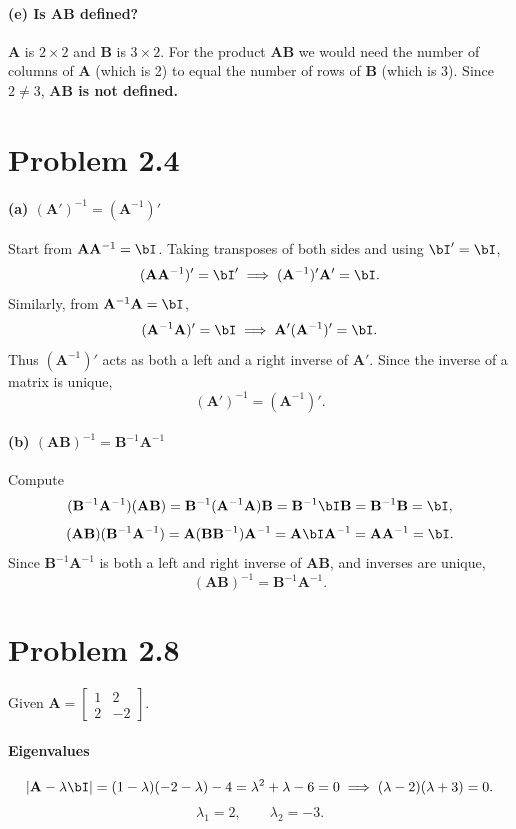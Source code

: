 \documentclass[11pt]{article}
\newcommand{\bA}{\mathbf{A}}
\newcommand{\bB}{\mathbf{B}}
\begin{document}
\paragraph{(e) Is $\bA\bB$ defined?}
$\bA$ is $2\times 2$ and $\bB$ is $3\times 2$. For the product $\bA\bB$ we would need the number of columns of $\bA$ (which is 2) to equal the number of rows of $\bB$ (which is 3). Since $2 \neq 3$, \textbf{$\bA\bB$ is not defined.}

\section*{Problem 2.4}

\paragraph{(a) $(\bA')^{-1} = (\bA^{-1})'$}
Start from $\bA\bA^{-1} = \bI$. Taking transposes of both sides and using $\bI' = \bI$,
\[
(\bA\bA^{-1})' = \bI' \;\Longrightarrow\; (\bA^{-1})'\bA' = \bI.
\]
Similarly, from $\bA^{-1}\bA = \bI$,
\[
(\bA^{-1}\bA)' = \bI \;\Longrightarrow\; \bA'(\bA^{-1})' = \bI.
\]
Thus $(\bA^{-1})'$ acts as both a left and a right inverse of $\bA'$. Since the inverse of a matrix is unique,
\[
(\bA')^{-1} = (\bA^{-1})'.
\]

\paragraph{(b) $(\bA\bB)^{-1} = \bB^{-1}\bA^{-1}$}
Compute
\[
(\bB^{-1}\bA^{-1})(\bA\bB) = \bB^{-1}(\bA^{-1}\bA)\bB = \bB^{-1}\bI\bB = \bB^{-1}\bB = \bI,
\]
\[
(\bA\bB)(\bB^{-1}\bA^{-1}) = \bA(\bB\bB^{-1})\bA^{-1} = \bA\bI\bA^{-1} = \bA\bA^{-1} = \bI.
\]
Since $\bB^{-1}\bA^{-1}$ is both a left and right inverse of $\bA\bB$, and inverses are unique,
\[
(\bA\bB)^{-1} = \bB^{-1}\bA^{-1}.
\]

\section*{Problem 2.8}

Given $\bA = \begin{bmatrix} 1 & 2 \\ 2 & -2 \end{bmatrix}$.

\paragraph{Eigenvalues}
\[
|\bA - \lambda \bI| = (1-\lambda)(-2-\lambda) - 4 = \lambda^2 + \lambda - 6 = 0
\;\Longrightarrow\; (\lambda-2)(\lambda+3) = 0.
\]
\[
\lambda_1 = 2, \qquad \lambda_2 = -3.
\]
\end{document}
